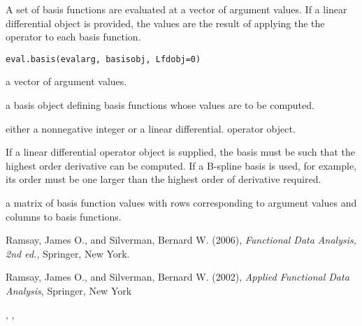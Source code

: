 \documentclass{article}
\begin{document}
\begin{Description}\relax
A set of basis functions are evaluated at a vector of argument values.
If a linear differential object is provided, the  values are the
result of applying the the operator to each basis function.
\end{Description}
\begin{Usage}
\begin{verbatim}
eval.basis(evalarg, basisobj, Lfdobj=0)
\end{verbatim}
\end{Usage}
\begin{Arguments}
\begin{ldescription}
\item[\code{evalarg}] a vector of argument values.

\item[\code{basisobj}] a basis object defining basis functions whose values
are to be computed.

\item[\code{Lfdobj}] either a nonnegative integer or a linear differential.
operator object.

\end{ldescription}
\end{Arguments}
\begin{Details}\relax
If a linear differential operator object is supplied, the basis must
be such that the highest order derivative can be computed. If a
B-spline basis is used, for example, its order must be one larger than
the highest order of derivative required.
\end{Details}
\begin{Value}
a matrix of basis function values with rows corresponding
to argument values and columns to basis functions.
\end{Value}
\begin{Source}\relax
Ramsay, James O., and Silverman, Bernard W. (2006), \emph{Functional
Data Analysis, 2nd ed.}, Springer, New York.

Ramsay, James O., and Silverman, Bernard W. (2002), \emph{Applied
Functional Data Analysis}, Springer, New York
\end{Source}
\begin{SeeAlso}\relax
{}, 
, 
\end{SeeAlso}
\end{document}
